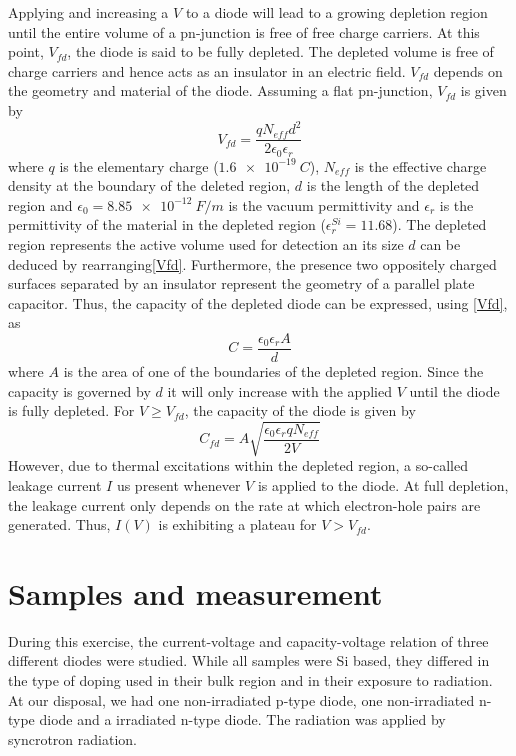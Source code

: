 \documentclass[11pt]{article}
\begin{document}
Applying and increasing a $V$ to a diode will lead to a growing depletion region until the entire volume of a pn-junction is free of free charge carriers.
At this point, $V_{fd}$, the diode is said to be fully depleted.
The depleted volume is free of charge carriers and hence acts as an insulator in an electric field. $V_{fd}$ depends on the geometry and material of the diode.
Assuming a flat pn-junction, $V_{fd}$ is given by
\begin{equation}
  \label{Vfd}
  V_{fd} = \frac{qN_{eff}d^2}{2\epsilon_0\epsilon_r}
\end{equation}
where $q$ is the elementary charge ($\SI{1.6e-19}{C}$), $N_{eff}$ is the effective charge density at the boundary of the deleted region, $d$ is the length of the depleted region and $\epsilon_0 = \SI{8.85e-12}{F/m}$ is the vacuum permittivity and $\epsilon_r$ is the permittivity of the material in the depleted region ($\epsilon_r^{Si} = 11.68$).
The depleted region represents the active volume used for detection an its size $d$ can be deduced by rearranging\eqref{Vfd}. 
Furthermore, the presence two oppositely charged surfaces separated by an insulator represent the geometry of a parallel plate capacitor. Thus, the capacity of the depleted diode can be expressed, using \eqref{Vfd}, as
\begin{equation}
  \label{C}
  C = \frac{\epsilon_{0}\epsilon_{r}A}{d}
\end{equation}
where $A$ is the area of one of the boundaries of the depleted region. Since the capacity is governed by $d$ it will only increase with the applied $V$ until the diode is fully depleted. For $V \geq V_{fd}$, the capacity of the diode is given by
\begin{equation}
  \label{eq:1}
   C_{fd} = A \sqrt{\frac{\epsilon_0\epsilon_rqN_{eff}}{2V}}
\end{equation}
However, due to thermal excitations within the depleted region, a so-called leakage current $I$  us present whenever $V$ is applied to the diode.
At full depletion, the leakage current only depends on the rate at which electron-hole pairs are generated. Thus, $I(V)$ is exhibiting a plateau for $V>V_{fd}$.

\section{Samples and measurement}
\label{sec:samples}
During this exercise, the current-voltage and capacity-voltage relation of three different diodes were studied. While all samples were Si based, they differed in the type of doping used in their bulk region and in their exposure to radiation.
At our disposal, we had one non-irradiated p-type diode, one non-irradiated n-type diode and a irradiated n-type diode. The radiation was applied by syncrotron radiation. 
\end{document}
